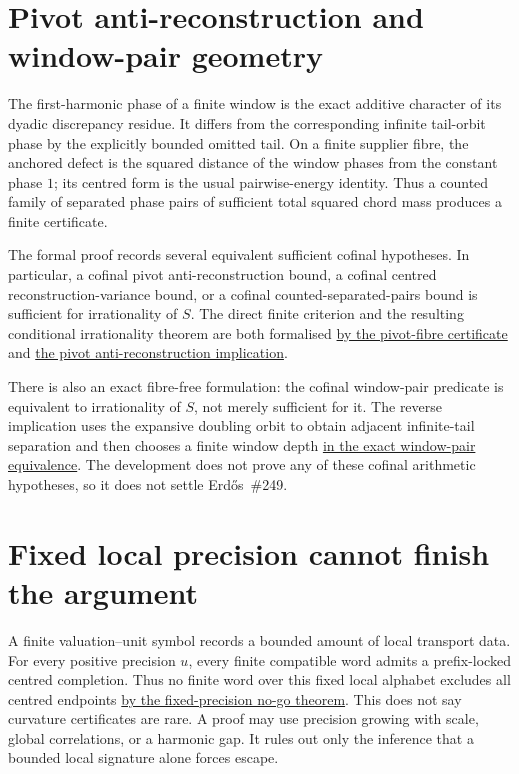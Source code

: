 \documentclass[11pt]{article}
\newcommand{\commit}{c24e2c2a781aa4a104d10884bacae52ef35cff30}
\newcommand{\repobase}{https://github.com/wcook04/plectis-lean-erdos249-257/blob/\commit}
\newcommand{\PK}{Erdos249257}
\newcommand{\lword}[4]{\href{\repobase/\PK/#1\#L#2}{#4}}
\theoremstyle{remark}\newtheorem*{remark}{Remark}
\begin{document}
\section{Pivot anti-reconstruction and window-pair geometry}\label{sec:pivot}
The first-harmonic phase of a finite window is the exact additive character of
its dyadic discrepancy residue.  It differs from the corresponding infinite
tail-orbit phase by the explicitly bounded omitted tail.  On a finite supplier
fibre, the anchored defect is the squared distance of the window phases from
the constant phase $1$; its centred form is the usual pairwise-energy identity.
Thus a counted family of separated phase pairs of sufficient total squared
chord mass produces a finite certificate.

The formal proof records several equivalent sufficient cofinal hypotheses.  In
particular, a cofinal pivot
anti-reconstruction bound, a cofinal centred reconstruction-variance bound, or
a cofinal counted-separated-pairs bound is sufficient for irrationality of
$S$. The direct finite criterion and the resulting conditional irrationality
theorem are both formalised
\lword{PivotAntiReconstruction.lean}{1105}{exists_certifiedKill_of_pivotFiberSeparatedPairs}{by the pivot-fibre certificate}
and
\lword{PivotAntiReconstruction.lean}{1502}{irrational_totient_series_of_pivotAntiReconstruction}{the pivot anti-reconstruction implication}.

There is also an exact fibre-free formulation: the cofinal window-pair
predicate is equivalent to irrationality of $S$, not merely sufficient for it.
The reverse implication uses the expansive doubling orbit to obtain adjacent
infinite-tail separation and then chooses a finite window depth
\lword{PivotAntiReconstruction.lean}{1744}{dtwWindowSeparatedPairs_iff_irrational_totient_series}{in the exact window-pair equivalence}.
The development does not prove any of these cofinal arithmetic hypotheses, so it does
not settle Erd\H{o}s~\#249.

\section{Fixed local precision cannot finish the argument}\label{sec:nogo}
A finite valuation--unit symbol records a bounded amount of local transport
data.  For every positive precision $u$, every finite compatible word admits
a prefix-locked centred completion.  Thus no finite word over this fixed local
alphabet excludes all centred endpoints
\lword{TropicalCurvatureCarry.lean}{137}{fixedPrecisionTropicalNoGo}{by the fixed-precision no-go theorem}.
This does not say curvature certificates are rare.  A proof may use precision
growing with scale, global correlations, or a harmonic gap.  It rules out only
the inference that a bounded local signature alone forces escape.
\end{document}
